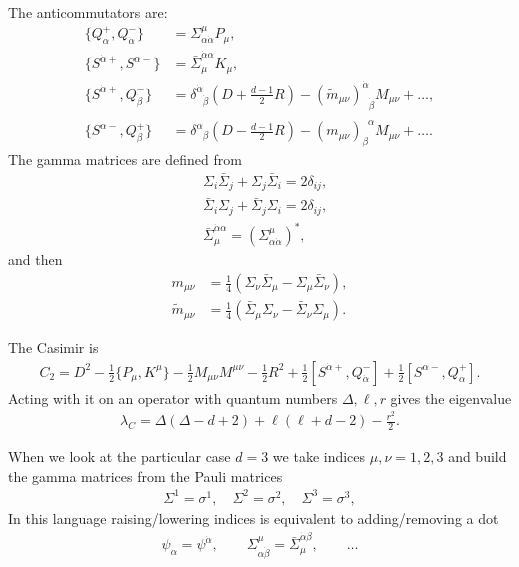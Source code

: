 \documentclass[letterpaper]{article}
\def\a{{\alpha}}
\def\b{{\beta}}
\def\ad{{\dot{\alpha}}}
\def\bd{{\dot{\beta}}}
\def\ph{\phantom}
\def \ph{\phantom}
\begin{document}
The anticommutators are:
\begin{align}
 \{ Q^+_\a, Q^-_\ad \}   & =      \Sigma^\mu_{\a\ad} P_\mu, \\
 \{ S^{\ad+}, S^{\a-} \} & = \bar \Sigma^{\ad\a}_\mu K_\mu, \\
 \{ S^{\ad+}, Q^-_\bd \} 
   & = \delta^\ad_{\ph \ad\bd} \left(D + \frac{d-1}{2} R \right) 
     -  (\tilde m_{\mu\nu})^\ad_{\ph \ad\bd} M_{\mu\nu}
     + \ldots, \\
 \{ S^{\a-}, Q^+_\b \} 
   & = \delta^\a_{\ph \a\b} \left(D - \frac{d-1}{2} R \right) 
     - (m_{\mu\nu})_\b^{\ph \b\a} M_{\mu\nu}
     + \ldots.
\end{align}
The gamma matrices are defined from
\begin{align}
 & \Sigma_i \bar \Sigma_j + \Sigma_j \bar \Sigma_i = 2 \delta_{ij}, \\
 & \bar \Sigma_i \Sigma_j + \bar \Sigma_j \Sigma_i = 2 \delta_{ij}, \\
 & \bar \Sigma^{\ad\a}_\mu = \left( \Sigma^\mu_{\a\ad} \right)^*,
\end{align}
and then
\begin{align}
 m_{\mu\nu} & = \frac{1}{4} \left( 
    \Sigma_\nu \bar \Sigma_\mu - 
    \Sigma_\mu \bar \Sigma_\nu
 \right), \\
 \tilde m_{\mu\nu} & = \frac{1}{4} \left( 
    \bar \Sigma_\mu \Sigma_\nu - 
    \bar \Sigma_\nu \Sigma_\mu
 \right).
\end{align}

The Casimir is
\begin{align}
 C_2 = 
    D^2
  - \frac12 \{ P_\mu, K^\mu \}
  - \frac12 M_{\mu\nu} M^{\mu\nu}
  - \frac12 R^2
  + \frac12 [ S^{\ad+}, Q^-_\ad]
  + \frac12 [ S^{\a-}, Q^+_\a].
\end{align}
Acting with it on an operator with quantum numbers $\Delta, \ell, r$ gives the eigenvalue
\begin{align}
 \lambda_C 
 = \Delta (\Delta - d + 2)
 + \ell(\ell + d - 2)
 - \frac{r^2}{2}.
\end{align}

When we look at the particular case $d = 3$ we take indices $\mu,\nu = 1, 2, 3$ and build the gamma matrices from the Pauli matrices
\begin{align}
 \Sigma^1 = \sigma^1, \quad
 \Sigma^2 = \sigma^2, \quad
 \Sigma^3 = \sigma^3,
\end{align}
In this language raising/lowering indices is equivalent to adding/removing a dot
\begin{align}
 \psi_\a = \psi^{\ad}, \qquad
 \Sigma^\mu_{\a\bd} = \bar \Sigma_\mu^{\ad\b}, \qquad
 \ldots
\end{align}
\end{document}
